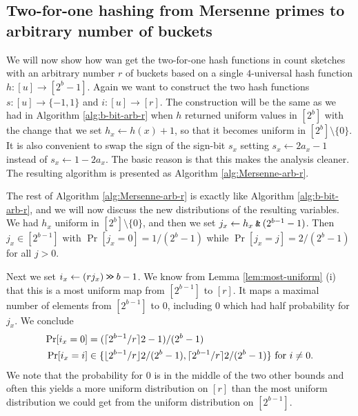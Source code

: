 \subsection{Two-for-one hashing from Mersenne primes to arbitrary number of buckets}
We will now show how wan get the two-for-one hash functions in count
sketches with an arbitrary number $r$ of buckets based on a single
$4$-universal hash function $h:[u]\to [2^b-1]$.  Again we want to
construct the two hash functions $s:[u]\to\{-1,1\}$ and
$i:[u]\to[r]$.  The construction will be the same as we had in
Algorithm \ref{alg:b-bit-arb-r} when $h$ returned uniform values in
$[2^b]$ with the change that we set $h_x\gets h(x)+1$, so that it
becomes uniform in $[2^b]\setminus\{0\}$. It is also convenient to
swap the sign of the sign-bit $s_x$ setting $s_x\gets 2a_x - 1$ instead
of $s_x\gets 1-2a_x$. The basic reason is that this makes the analysis
cleaner. The resulting algorithm
is presented as Algorithm \ref{alg:Mersenne-arb-r}.
The rest of Algorithm \ref{alg:Mersenne-arb-r} is exactly like 
Algorithm \ref{alg:b-bit-arb-r}, and we will now discuss the new
distributions of the resulting variables. We had
$h_x$ uniform in $[2^b]\setminus\{0\}$, and then we set
$j_x \gets h_x\mathbin{\texttt{\&}}(2^{b-1}-1)$. Then $j_x\in[2^{b-1}]$ with 
$\Pr[j_x=0]=1/(2^{b}-1)$ while  $\Pr[j_x=j]=2/(2^{b}-1)$ for all $j>0$.

Next we set $i_x\gets (rj_x)\mathbin{\texttt{>\!>}} b-1$. We know from Lemma
\ref{lem:most-uniform} (i) that this is a most uniform map from
$[2^{b-1}]$ to $[r]$.  It maps a maximal number of elements from
$[2^{b-1}]$ to $0$, including $0$ which had half probability for
$j_x$.
We conclude
\begin{align}
   \Pr[i_x=0] &= (\lceil {2^{b-1}/r}\rceil2-1)/(2^{b}-1)
   \label{eq:prix0}
   \\
   \Pr[i_x = i] &\in
   \{\lfloor {2^{b-1}/r} \rfloor2/(2^{b}-1), \lceil {2^{b-1}/r}\rceil2/(2^{b}-1)\}
   \mbox{ for $i \neq  0$}
   \label{eq:prixneq0}
   .
\end{align}
We note
that the probability for $0$ is in the middle of the two other
bounds and often this yields a more uniform distribution on $[r]$ than
the most uniform distribution we could get from the
uniform distribution on $[2^{b-1}]$.


